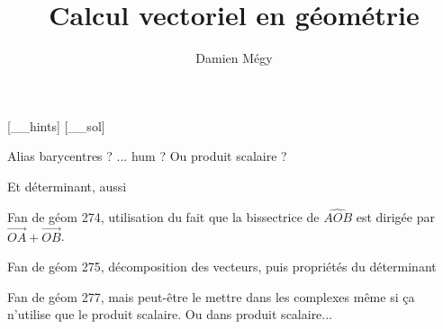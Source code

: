 




[_\jobname_hints]
[_\jobname_sol]


\title{Calcul vectoriel en géométrie}
\author{Damien Mégy}
\maketitle

\avertissement 


Alias barycentres ? ... hum ? Ou produit scalaire ?

Et déterminant, aussi

\begin{exo}
Fan de géom 274, utilisation du fait que la bissectrice de $\widehat{AOB}$ est dirigée par $\vec{OA}+\vec{OB}$.
\end{exo}

\begin{exo}
Fan de géom 275,  décomposition des vecteurs, puis propriétés du déterminant
\end{exo}

\begin{exo}
Fan de géom 277,  mais peut-être le mettre dans les complexes même si ça n'utilise que le produit scalaire. Ou dans produit scalaire...
\end{exo}



\indications
\correction



